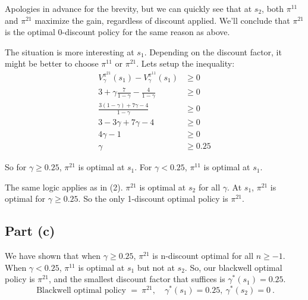 \documentclass[12pt]{article}
\begin{document}
Apologies in advance for the brevity, but we can quickly see that at $s_2$, both $\pi^{11}$ and $\pi^{21}$
maximize the gain, regardless of discount applied. We'll conclude that $\pi^{21}$ is the optimal 0-discount policy
for the same reason as above.

\medskip
The situation is more interesting at $s_1$. Depending on the discount factor, it might be better to
choose $\pi^{11}$ or $\pi^{21}$. Lets setup the inequality:
\begin{align*}
		V^{\pi^{21}}_\gamma(s_1) - V^{\pi^{11}}_\gamma(s_1) &\geq 0\\
		3 + \gamma\frac{7}{1-\gamma} - \frac{4}{1-\gamma} &\geq 0\\
		\frac{3(1-\gamma) + 7\gamma - 4}{1-\gamma} &\ge 0 \\
		3 - 3\gamma + 7\gamma - 4 &\ge 0 \\
		4\gamma - 1 &\ge 0 \\
		\gamma &\ge 0.25
\end{align*}

So for $\gamma \geq 0.25$, $\pi^{21}$ is optimal at $s_1$. For $\gamma < 0.25$, $\pi^{11}$ is optimal at $s_1$.

The same logic applies as in (2). $\pi^{21}$ is optimal at $s_2$ for all $\gamma$. At $s_1$, $\pi^{21}$ is
optimal for $\gamma \geq 0.25$. So the only 1-discount optimal policy is $\pi^{21}$.

\medskip
\subsection*{Part (c)}
We have shown that when $\gamma\ge 0.25$, $\pi^{21}$ is n-discount optimal for all $n\ge -1$.
When $\gamma<0.25$, $\pi^{11}$ is optimal at $s_1$ but not at $s_2$. So, our blackwell optimal policy
is $\pi^{21}$, and the smallest discount factor that suffices is $\gamma^\ast(s_1)=0.25$.
\[
		\boxed{\ \text{Blackwell optimal policy }=\ \pi^{21},\quad \gamma^\ast(s_1)=0.25,\ \gamma^\ast(s_2)=0\ }.
\]

\end{document}
